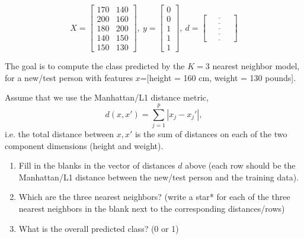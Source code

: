 \documentclass{article}
\begin{document}
\begin{equation*}
  X = \left[\begin{array}{cc}
              170 & 140 \\
              200 & 160 \\
              180 & 200 \\
              140 & 150 \\
              150 & 130
\end{array}\right],\ 
  y = \left[\begin{array}{c}
              0 \\
              0 \\
              1 \\
              1 \\
              1
\end{array}\right],\ 
  d = \left[\begin{array}{c}
              \underline{\hspace{1cm}}\\
              \underline{\hspace{1cm}}\\
              \underline{\hspace{1cm}}\\
              \underline{\hspace{1cm}}\\
              \underline{\hspace{1cm}}
\end{array}\right]
\end{equation*}

The goal is to compute the class predicted by the $K=3$ nearest
neighbor model, for a new/test person with features $x$=[height = 160 cm,
weight = 130 pounds].

Assume that we use the Manhattan/L1 distance metric, 
\begin{equation*}
  d(x,x') = \sum_{j=1}^p |x_j-x_j'|,
\end{equation*}
i.e. the total distance between $x,x'$ is the sum of distances on each
of the two component dimensions (height and weight).

\begin{enumerate}
\item Fill in the blanks in the vector of distances $d$ above (each
  row should be the Manhattan/L1 distance between the new/test person
  and the training data).
\item Which are the three nearest neighbors? (write a star* for each
  of the three nearest neighbors in the blank next to the
  corresponding distances/rows)
\item What is the overall predicted class? (0 or 1)
\end{enumerate}
\end{document}
